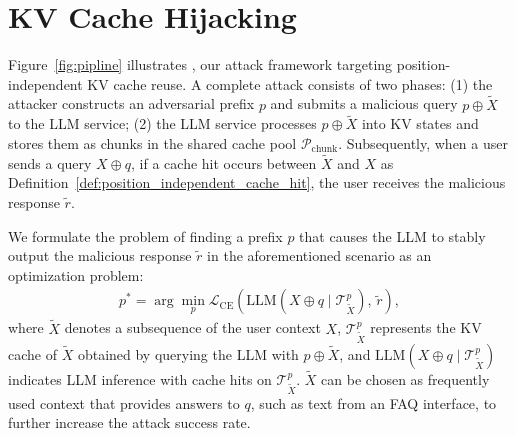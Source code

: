 

\section{KV Cache Hijacking}\label{sec:hijack_kv}

Figure~\ref{fig:pipline} illustrates \sys, our attack framework targeting position-independent KV cache reuse. A complete attack consists of two phases: (1) the attacker constructs an adversarial prefix $p$ and submits a malicious query $p \oplus \tilde{X}$ to the LLM service; (2) the LLM service processes $p \oplus \tilde{X}$ into KV states and stores them as chunks in the shared cache pool $\mathcal{P}_\text{chunk}$. Subsequently, when a user sends a query $X \oplus q$, if a cache hit occurs between $\tilde{X}$ and $X$ as Definition~\ref{def:position_independent_cache_hit}, the user receives the malicious response $\tilde{r}$.

We formulate the problem of finding a prefix $p$ that causes the LLM to stably output the malicious response $\tilde{r}$ in the aforementioned scenario as an optimization problem:
\begin{align}\label{eq:cache_dop}
    p^* = \arg\min_{p} \mathcal{L}_{\text{CE}}\left( \text{LLM}(X \oplus q \mid \mathcal{T}^p_{\tilde{X}}), \, \tilde{r} \right), 
\end{align}
where $\tilde{X}$ denotes a subsequence of the user context $X$, $\mathcal{T}^p_{\tilde{X}}$ represents the KV cache of $\tilde{X}$ obtained by querying the LLM with $p \oplus \tilde{X}$, and $\text{LLM}(X \oplus q \mid \mathcal{T}^p_{\tilde{X}})$ indicates LLM inference with cache hits on $\mathcal{T}^p_{\tilde{X}}$.
% 
$\tilde{X}$ can be chosen as frequently used context that provides answers to $q$, such as text from an FAQ interface, to further increase the attack success rate.

